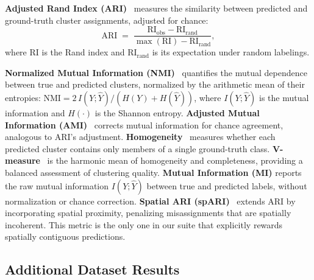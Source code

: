 \documentclass{article}
\theoremstyle{plain}
\theoremstyle{definition}
\begin{document}
\textbf{Adjusted Rand Index (ARI)}~\cite{hubert1985comparing} measures the similarity between predicted and ground-truth cluster assignments, adjusted for chance:
\begin{equation}
    \mathrm{ARI} \;=\; \frac{\mathrm{RI}_{\text{obs}} - \mathrm{RI}_{\text{rand}}}{\max(\mathrm{RI}) - \mathrm{RI}_{\text{rand}}},
    \label{eq:ari}
\end{equation}
where $\mathrm{RI}$ is the Rand index and $\mathrm{RI}_{\text{rand}}$ is its expectation under random labelings.

\textbf{Normalized Mutual Information (NMI)}~\cite{strehl2002cluster} quantifies the mutual dependence between true and predicted clusters, normalized by the arithmetic mean of their entropies: $\mathrm{NMI} = 2\,I(Y;\hat{Y}) / (H(Y) + H(\hat{Y}))$, where $I(Y;\hat{Y})$ is the mutual information and $H(\cdot)$ is the Shannon entropy.
\textbf{Adjusted Mutual Information (AMI)}~\cite{vinh2010information} corrects mutual information for chance agreement, analogous to ARI's adjustment.
\textbf{Homogeneity}~\cite{rosenberg2007v} measures whether each predicted cluster contains only members of a single ground-truth class.
\textbf{V-measure}~\cite{rosenberg2007v} is the harmonic mean of homogeneity and completeness, providing a balanced assessment of clustering quality.
\textbf{Mutual Information (MI)} reports the raw mutual information $I(Y;\hat{Y})$ between true and predicted labels, without normalization or chance correction.
\textbf{Spatial ARI (spARI)}~\cite{cui2024spari} extends ARI by incorporating spatial proximity, penalizing misassignments that are spatially incoherent. This metric is the only one in our suite that explicitly rewards spatially contiguous predictions.

\subsection{Additional Dataset Results}
\end{document}
